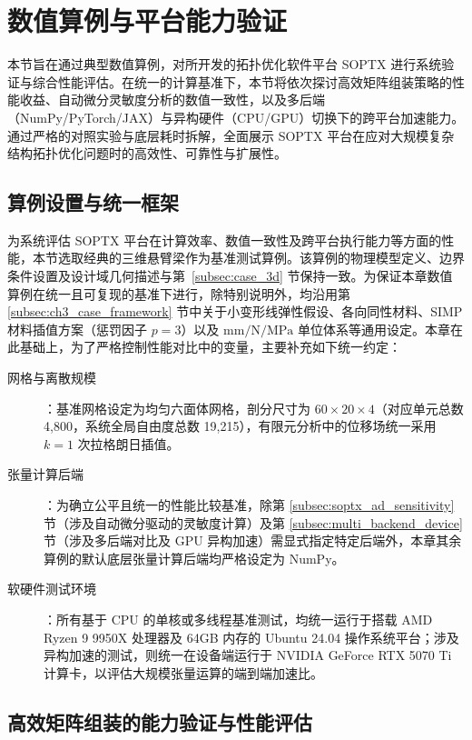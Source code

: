 \section{数值算例与平台能力验证}
\label{sec:soptx:valid}

本节旨在通过典型数值算例，对所开发的拓扑优化软件平台 SOPTX 进行系统验证与综合性能评估。在统一的计算基准下，本节将依次探讨高效矩阵组装策略的性能收益、自动微分灵敏度分析的数值一致性，以及多后端（NumPy/PyTorch/JAX）与异构硬件（CPU/GPU）切换下的跨平台加速能力。通过严格的对照实验与底层耗时拆解，全面展示 SOPTX 平台在应对大规模复杂结构拓扑优化问题时的高效性、可靠性与扩展性。


\subsection{算例设置与统一框架}
\label{subsec:ch6_setup_framework}

为系统评估 SOPTX 平台在计算效率、数值一致性及跨平台执行能力等方面的性能，本节选取经典的三维悬臂梁作为基准测试算例。该算例的物理模型定义、边界条件设置及设计域几何描述与第~\ref{subsec:case_3d} 节保持一致。为保证本章数值算例在统一且可复现的基准下进行，除特别说明外，均沿用第 \ref{subsec:ch3_case_framework} 节中关于小变形线弹性假设、各向同性材料、SIMP 材料插值方案（惩罚因子 $p=3$）以及 $\mathrm{mm}/\mathrm{N}/\mathrm{MPa}$ 单位体系等通用设定。本章在此基础上，为了严格控制性能对比中的变量，主要补充如下统一约定：

\begin{description}
	\item[网格与离散规模]：基准网格设定为均匀六面体网格，剖分尺寸为 $60\times20\times4$（对应单元总数 4,800，系统全局自由度总数 19,215），有限元分析中的位移场统一采用 $k=1$ 次拉格朗日插值。
	
	\item[张量计算后端]：为确立公平且统一的性能比较基准，除第 \ref{subsec:soptx_ad_sensitivity} 节（涉及自动微分驱动的灵敏度计算）及第 \ref{subsec:multi_backend_device} 节（涉及多后端对比及 GPU 异构加速）需显式指定特定后端外，本章其余算例的默认底层张量计算后端均严格设定为 NumPy。
	
	\item[软硬件测试环境]：所有基于 CPU 的单核或多线程基准测试，均统一运行于搭载 AMD Ryzen 9 9950X 处理器及 64GB 内存的 Ubuntu 24.04 操作系统平台；涉及异构加速的测试，则统一在设备端运行于 NVIDIA GeForce RTX 5070 Ti 计算卡，以评估大规模张量运算的端到端加速比。
\end{description}


\subsection{高效矩阵组装的能力验证与性能评估}
\label{subsec:soptx_assemle_matrix}

